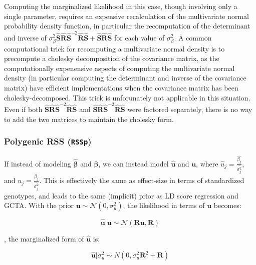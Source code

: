 Computing the marginalized likelihood in this case, though involving only a single parameter, requires an expensive recalculation of the multivariate normal probability density function, in particular 
the recomputation of the determinant and inverse of \(\sigma_\beta^2\hat{\textbf{S}}\hat{\textbf{R}}\hat{\textbf{S}}^{-2}\hat{\textbf{R}}\hat{\textbf{S}}+\hat{\textbf{S}}\hat{\textbf{R}}\hat{\textbf{S}}\) for each value of 
\(\sigma_\beta^2\).  A common computational trick for recomputing a multivariate normal density is to precompute a cholesky decomposition of the covariance matrix, as the computationally expenensive aspects of computing the multivariate normal density (in particular computing the determinant and inverse of the covariance matrix) have efficient implementations when the covariance matrix has been cholesky-decomposed.  This trick is unforunately not applicable in this situation.  Even if both $\hat{\textbf{S}}\hat{\textbf{R}}\hat{\textbf{S}}^{-2}\hat{\textbf{R}}\hat{\textbf{S}}$ and $\hat{\textbf{S}}\hat{\textbf{R}}\hat{\textbf{S}}^{-2}\hat{\textbf{R}}\hat{\textbf{S}}$ were factored separately, there is no way to add the two matrices to maintain the cholesky form.


\subsubsection{Polygenic RSS (\texttt{RSSp})}\label{sec:org040cb73}

If instead of modeling \(\hat{\boldsymbol{\beta}}\) and \(\boldsymbol{\beta}\), we can instead model $\hat{\textbf{u}}$ and $\textbf{u}$, where $\hat{u}_j=\frac{\hat{\beta_j}}{\hat{\sigma_j^2}}$, and  \(u_j=\frac{\beta_j}{\hat{\sigma_j^2}}\).  This is effectively the same as effect-size in terms of standardized genotypes, and leads to the same (implicit) prior as LD score regression\cite{ldsc} and GCTA\cite{GCTA}.  With the prior $\textbf{u} \sim \mathcal{N}(0,\sigma_u^2)$, the likelihood in terms of $\textbf{u}$ becomes:

$$\hat{\textbf{u}} | \textbf{u} \sim \mathcal{N}(\textbf{R} \textbf{u},\textbf{R})$$

, the marginalized form of $\hat{\textbf{u}}$ is:

\[ \hat{\textbf{u}}|\sigma_u^2 \sim N(0,\sigma_u^2\textbf{R}^2+\textbf{R})\]

